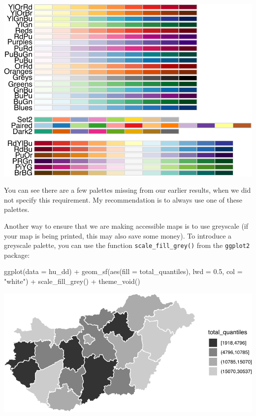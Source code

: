 \documentclass[
]{book}
\newenvironment{Shaded}{\begin{snugshade}}{\end{snugshade}}
\newcommand{\AttributeTok}[1]{\textcolor[rgb]{0.77,0.63,0.00}{#1}}
\newcommand{\FloatTok}[1]{\textcolor[rgb]{0.00,0.00,0.81}{#1}}
\newcommand{\FunctionTok}[1]{\textcolor[rgb]{0.00,0.00,0.00}{#1}}
\newcommand{\NormalTok}[1]{#1}
\newcommand{\SpecialCharTok}[1]{\textcolor[rgb]{0.00,0.00,0.00}{#1}}
\newcommand{\StringTok}[1]{\textcolor[rgb]{0.31,0.60,0.02}{#1}}
\begin{document}
\includegraphics{crime_mapping_files/figure-latex/unnamed-chunk-158-1.pdf}

You can see there are a few palettes missing from our earlier results, when we did not specify this requirement. My recommendation is to always use one of these palettes.

Another way to ensure that we are making accessible maps is to use greyscale (if your map is being printed, this may also save some money). To introduce a greyscale palette, you can use the function \texttt{scale\_fill\_grey()} from the \texttt{ggplot2} package:

\begin{Shaded}
\begin{Highlighting}[]
\FunctionTok{ggplot}\NormalTok{(}\AttributeTok{data =}\NormalTok{ hu\_dd) }\SpecialCharTok{+} 
  \FunctionTok{geom\_sf}\NormalTok{(}\FunctionTok{aes}\NormalTok{(}\AttributeTok{fill =}\NormalTok{ total\_quantiles), }\AttributeTok{lwd =} \FloatTok{0.5}\NormalTok{, }\AttributeTok{col =} \StringTok{"white"}\NormalTok{) }\SpecialCharTok{+} 
  \FunctionTok{scale\_fill\_grey}\NormalTok{() }\SpecialCharTok{+} 
  \FunctionTok{theme\_void}\NormalTok{()}
\end{Highlighting}
\end{Shaded}

\includegraphics{crime_mapping_files/figure-latex/greyscaletestsmap-1.pdf}
\end{document}
